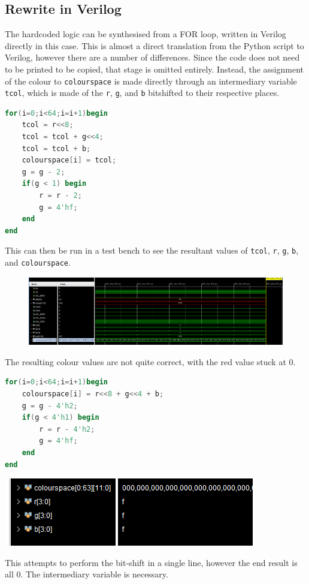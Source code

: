 \subsection{Rewrite in Verilog}
The hardcoded logic can be synthesised from a FOR loop, written in Verilog directly in this case.
This is almost a direct translation from the Python script to Verilog, however there are a number of differences. 
Since the code does not need to be printed to be copied, that stage is omitted entirely. Instead, the assignment of the 
colour to \lstinline|colourspace| is made directly through an intermediary variable \lstinline|tcol|, 
which is made of the \lstinline|r|, \lstinline|g|, and \lstinline|b| bitshifted to their respective places.
\begin{lstlisting}[language=Verilog]
for(i=0;i<64;i=i+1)begin
    tcol = r<<8;
    tcol = tcol + g<<4;
    tcol = tcol + b;
    colourspace[i] = tcol;
    g = g - 2;
    if(g < 1) begin
        r = r - 2;
        g = 4'hf;
    end
end
\end{lstlisting}
This can then be run in a test bench to see the resultant values of
\lstinline|tcol|, \lstinline|r|, \lstinline|g|, \lstinline|b|, and \lstinline|colourspace|.
\begin{figure}[H]
    \centering
    \includegraphics[width=\textwidth]{figures/tb/1.png}
\end{figure}
The resulting colour values are not quite correct, with the red value stuck at 0.

\begin{minipage}{0.475\linewidth}
\begin{lstlisting}[language=Verilog]
for(i=0;i<64;i=i+1)begin
    colourspace[i] = r<<8 + g<<4 + b;
    g = g - 4'h2;
    if(g < 4'h1) begin
        r = r - 4'h2;
        g = 4'hf;
    end
end    
\end{lstlisting}
\end{minipage}\hfill
\begin{minipage}{0.5\linewidth}
    \centering
    \includegraphics[width=\linewidth]{figures/tb/2.png}
\end{minipage}
This attempts to perform the bit-shift in a single line, however the end result is all 0.
The intermediary variable is necessary. 

